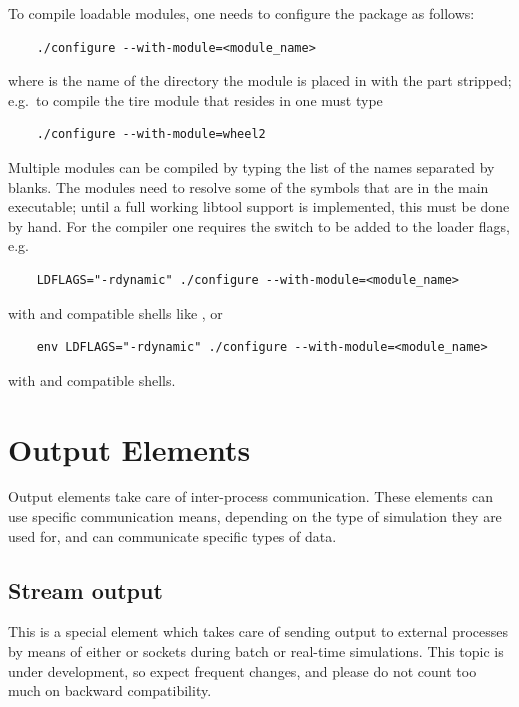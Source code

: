 \noindent
To compile loadable modules, one needs to configure
the package as follows:
\begin{verbatim}
    ./configure --with-module=<module_name>
\end{verbatim}
where  is the name of the directory the module
is placed in with the  part stripped; e.g.\ to compile
the tire module that resides in  
one must type
\begin{verbatim}
    ./configure --with-module=wheel2
\end{verbatim}
Multiple modules can be compiled by typing the list of the names
separated by blanks.
The modules need to resolve some of the symbols that are in the
main executable; until a full working libtool support is implemented,
this must be done by hand.
For the  compiler one requires the switch  
to be added to the loader flags, e.g.
\begin{verbatim}
    LDFLAGS="-rdynamic" ./configure --with-module=<module_name>
\end{verbatim}
with  and compatible shells like , or
\begin{verbatim}
    env LDFLAGS="-rdynamic" ./configure --with-module=<module_name>
\end{verbatim}
with  and compatible shells.





\section{Output Elements}
Output elements take care of inter-process communication.
These elements can use specific communication means,
depending on the type of simulation they are used for,
and can communicate specific types of data.

\subsection{Stream output}\label{sec:EL:OUTELEM:STREAM_OUTPUT}
This is a special element which takes care of sending output
to external processes by means of either  or  sockets
during batch or real-time simulations.
This topic is under development, so expect frequent changes, and
please do not count too much on backward compatibility.

